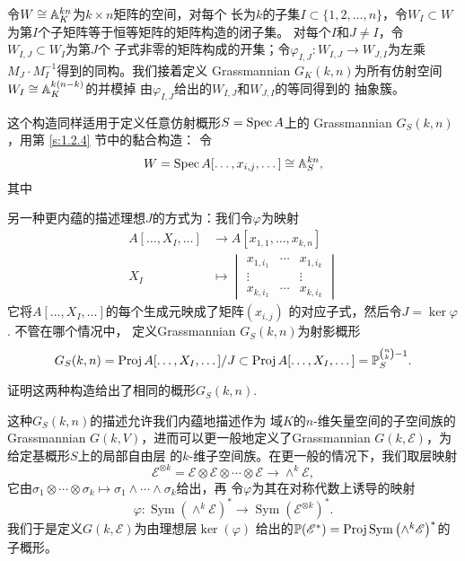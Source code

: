 令$W\cong \mathbb{A}_K^{kn}$为$k\times n$矩阵的空间，对每个
长为$k$的子集$I\subset \{1,2,\dots,n\}$，令$W_I\subset W$
为第$I$个子矩阵等于恒等矩阵的矩阵构造的闭子集。%
对每个$I$和$J\neq I$，令$W_{I,J}\subset W_I$为第$J$个
子式非零的矩阵构成的开集；令$\varphi_{I,J}:W_{I,J}\to
W_{J,I}$为左乘$M_J\cdot M_I^{-1}$得到的同构。我们接着定义
Grassmannian $G_K(k,n)$为所有仿射空间
$W_I\cong \mathbb{A}_K^{k(n-k)}$的并模掉
由$\varphi_{I,J}$给出的$W_{I,J}$和$W_{J,I}$的等同得到的
抽象簇。

这个构造同样适用于定义任意仿射概形$S=\operatorname{Spec} A$上的
Grassmannian $G_S(k,n)$，用第 \ref{s:1.2.4} 节中的黏合构造：
令
\[
	W=\operatorname{Spec} A[\dots,x_{i,j},\dots]\cong \mathbb{A}_S^{kn},
\]
其中


另一种更内蕴的描述理想$J$的方式为：我们令$\varphi$为映射
\begin{align*}
A[\dots,X_I,\dots]&\longrightarrow 
A[x_{1,1},\dots,x_{k,n}]\\
X_I &\longmapsto 
\begin{vmatrix}
x_{1,i_1}&\cdots & x_{1,i_k}\\
\vdots &&\vdots\\
x_{k,i_1}&\cdots & x_{k,i_k}
\end{vmatrix}
\end{align*}
它将$A[\dots,X_I,\dots]$的每个生成元映成了矩阵$(x_{i,j})$
的对应子式，然后令$J=\ker \varphi$. 不管在哪个情况中，
定义Grassmannian $G_S(k,n)$为射影概形
\[
	G_S(k,n)=\operatorname{Proj} A[\dots,X_I,\dots]/J
	\subset \operatorname{Proj} A[\dots,X_I,\dots]=\mathbb{P}_S^{\binom nk -1}.
\]

\begin{exe}\label{exe:3.49}
证明这两种构造给出了相同的概形$G_S(k,n)$.
\end{exe}

这种$G_S(k,n)$的描述允许我们内蕴地描述作为
域$K$的$n$-维矢量空间的子空间族的Grassmannian
$G(k,V)$，进而可以更一般地定义了Grassmannian
$G(k,\mathscr E)$，为给定基概形$S$上的局部自由层
的$k$-维子空间族。在更一般的情况下，我们取层映射
\[
	\mathscr E^{\otimes k}=
	\mathscr E\otimes\mathscr E\otimes\cdots\otimes
	\mathscr E\longrightarrow \wedge^k\mathscr E,
\]
它由$\sigma_1\otimes \cdots\otimes \sigma_k\mapsto
\sigma_1\wedge \cdots\wedge \sigma_k$给出，再
令$\varphi$为其在对称代数上诱导的映射
\[
	\varphi:\operatorname{Sym}\left(\wedge^k 
	\mathscr E\right)^* \longrightarrow \operatorname{Sym}
	\left(\mathscr E^{\otimes k}\right)^*.
\]
我们于是定义$G(k,\mathscr E)$为由理想层$\ker(\varphi)$
给出的$\mathbb{P}(\mathscr E^*)=\operatorname{Proj} \operatorname{Sym}
\left(\wedge^k \mathscr E\right)^*$的子概形。

